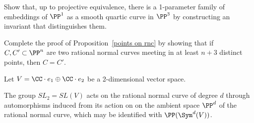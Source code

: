 \begin{exercise}\label{distinguishing rational quartics}
Show that, up to projective equivalence, there is a 1-parameter family of embeddings of $\PP^1$ as a 
smooth quartic curve in $\PP^3$ 
by constructing an invariant that distinguishes them. 
\end{exercise}

\begin{exercise}\label{Castelnuovo uniqueness}
Complete the proof of Proposition~\ref{points on rnc} by showing that if $C, C' \subset \PP^n$ are two rational normal curves meeting in at least $n+3$ distinct points, then $C = C'$. 
\end{exercise}


\begin{exercise}\label{rnc and representations}
Let $V = \CC\cdot e_1\oplus \CC\cdot e_2$ be a 2-dimensional vector space. 

The group $SL_2= SL(V)$ acts on the rational normal curve of degree $d$ through automorphisms induced from its action on
 on the ambient space $\PP^d$ of the rational normal curve, which may be identified with $\PP(\Sym^d(V))$.


\end{exercise}
